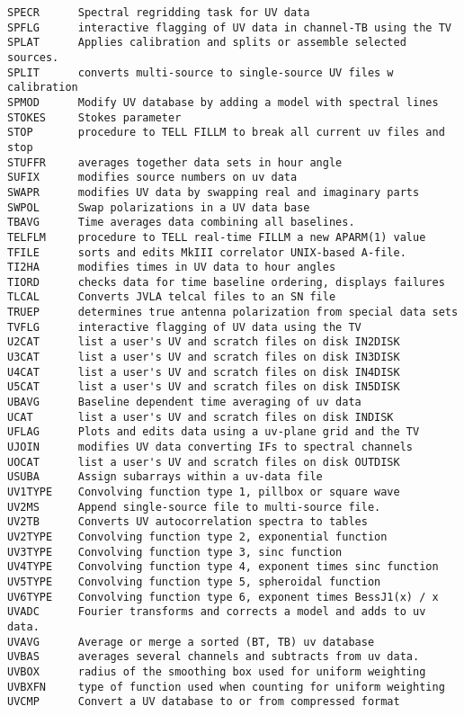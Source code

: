 \begin{verbatim}
SPECR      Spectral regridding task for UV data
SPFLG      interactive flagging of UV data in channel-TB using the TV
SPLAT      Applies calibration and splits or assemble selected sources.
SPLIT      converts multi-source to single-source UV files w calibration
SPMOD      Modify UV database by adding a model with spectral lines
STOKES     Stokes parameter
STOP       procedure to TELL FILLM to break all current uv files and stop
STUFFR     averages together data sets in hour angle
SUFIX      modifies source numbers on uv data
SWAPR      modifies UV data by swapping real and imaginary parts
SWPOL      Swap polarizations in a UV data base
TBAVG      Time averages data combining all baselines.
TELFLM     procedure to TELL real-time FILLM a new APARM(1) value
TFILE      sorts and edits MkIII correlator UNIX-based A-file.
TI2HA      modifies times in UV data to hour angles
TIORD      checks data for time baseline ordering, displays failures
TLCAL      Converts JVLA telcal files to an SN file
TRUEP      determines true antenna polarization from special data sets
TVFLG      interactive flagging of UV data using the TV
U2CAT      list a user's UV and scratch files on disk IN2DISK
U3CAT      list a user's UV and scratch files on disk IN3DISK
U4CAT      list a user's UV and scratch files on disk IN4DISK
U5CAT      list a user's UV and scratch files on disk IN5DISK
UBAVG      Baseline dependent time averaging of uv data
UCAT       list a user's UV and scratch files on disk INDISK
UFLAG      Plots and edits data using a uv-plane grid and the TV
UJOIN      modifies UV data converting IFs to spectral channels
UOCAT      list a user's UV and scratch files on disk OUTDISK
USUBA      Assign subarrays within a uv-data file
UV1TYPE    Convolving function type 1, pillbox or square wave
UV2MS      Append single-source file to multi-source file.
UV2TB      Converts UV autocorrelation spectra to tables
UV2TYPE    Convolving function type 2, exponential function
UV3TYPE    Convolving function type 3, sinc function
UV4TYPE    Convolving function type 4, exponent times sinc function
UV5TYPE    Convolving function type 5, spheroidal function
UV6TYPE    Convolving function type 6, exponent times BessJ1(x) / x
UVADC      Fourier transforms and corrects a model and adds to uv data.
UVAVG      Average or merge a sorted (BT, TB) uv database
UVBAS      averages several channels and subtracts from uv data.
UVBOX      radius of the smoothing box used for uniform weighting
UVBXFN     type of function used when counting for uniform weighting
UVCMP      Convert a UV database to or from compressed format

\end{verbatim}
